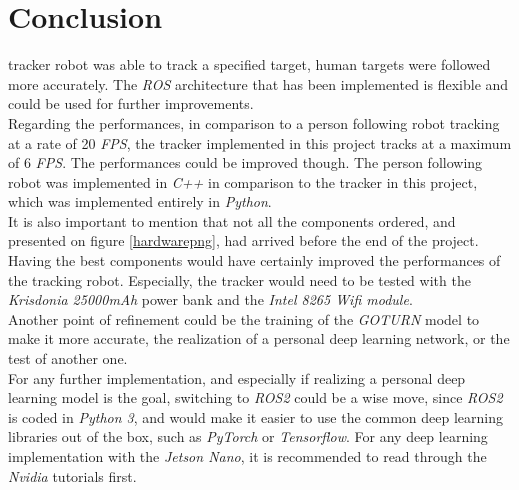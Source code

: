 \clearpage

\section*{Conclusion}

\begin{comment}
	
	Compare to the paper on the person following which had a 20 Fps. (check whether or not they did it in c++)
	What has been implemented and what has not been implemented.
 E	Ideas for further development : ROS2, c++

\end{comment}

 tracker robot was able to track 
a specified target, human targets were followed 
more accurately. The \textit{ROS} architecture
that has been implemented is flexible and could
be used for further improvements.
\\\indent Regarding the performances, in 
comparison to a person following robot \cite{personfollowing}
tracking at a rate of 20 \textit{FPS}, the tracker
implemented in this project tracks at a maximum of 6 \textit{FPS}.
The performances could be improved though. The person 
following robot was implemented in \textit{C++} in 
comparison to the tracker in this project, which was 
implemented entirely in \textit{Python}.
\\\indent It is also important to mention that not 
all the components ordered, and presented on 
figure \vref{hardwarepng}, had arrived before
the end of the project. Having the best components would 
have certainly improved the performances
of the tracking robot. Especially, the tracker 
would need to be tested with the \textit{Krisdonia 25000mAh}
power bank and the \textit{Intel 8265 Wifi module}.
\\\indent Another point of refinement could be the 
training of the \textit{GOTURN} model to make 
it more accurate, the realization of a personal 
deep learning network, or the test of another one.
\\\indent For any further implementation, 
and especially if realizing a personal 
deep learning model is the goal, switching to \textit{ROS2}
could be a wise move, since \textit{ROS2}
is coded in \textit{Python 3}, and would make it easier to 
use the common deep learning libraries out of the box, such 
as \textit{PyTorch} or \textit{Tensorflow}. 
For any deep learning implementation with the \textit{Jetson Nano}, 
it is recommended to read through the \textit{Nvidia} tutorials  first\cite{dptuto}.

